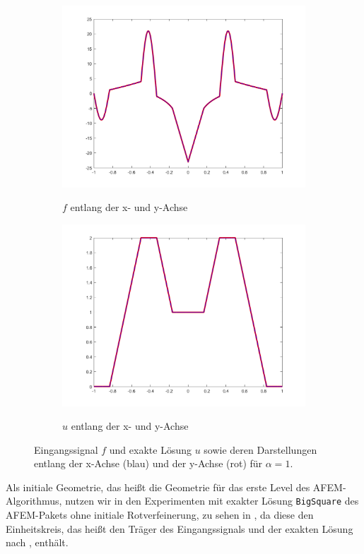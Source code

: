 \begin{figure}[!ht]
  \begin{subfigure}[b]{.48\linewidth}
    \caption{$f$ entlang der x- und y-Achse}
    \includegraphics[trim = 50 30 50 20, clip, width=\linewidth]
      {pictures/chapExperiments/secGeneralInfo/f01Plots/inSiAxis.png}
    \label{fig:f01InSiAxis}
  \end{subfigure}
  \quad
  \begin{subfigure}[b]{.48\linewidth}
    \caption{$u$ entlang der x- und y-Achse}
    \includegraphics[trim = 50 30 50 20, clip, width=\linewidth]
      {pictures/chapExperiments/secGeneralInfo/f01Plots/exactSolutionAxis.png}
    \label{fig:f01ExactSolAxis}
  \end{subfigure} 
  \caption{Eingangssignal $f$ und exakte Lösung $u$ sowie deren
  Darstellungen entlang der x-Achse (blau) und der y-Achse (rot) für
  $\alpha=1$.}
  \label{fig:f01Plots}
\end{figure}
Als initiale Geometrie, das heißt die Geometrie für das erste Level des
AFEM-Algorithmus, nutzen wir in den Experimenten mit exakter Lösung
\texttt{BigSquare} des AFEM-Pakets ohne initiale Rotverfeinerung, zu sehen in
, da diese den Einheitskreis, das heißt den Träger
des Eingangssignals und der exakten Lösung nach
, enthält.

